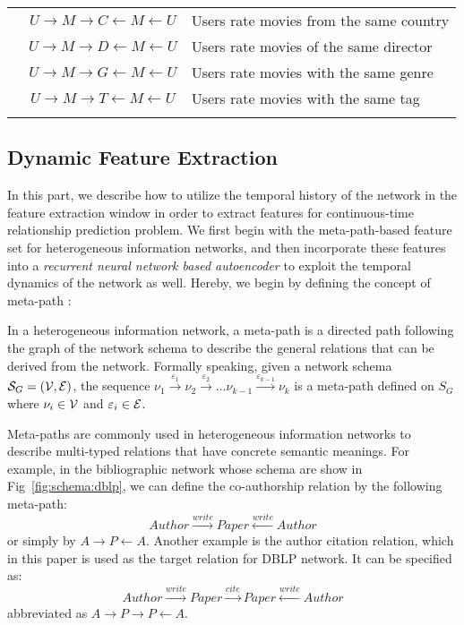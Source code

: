 \begin{table}[t]
\begin{tabular} {c c l}
		& $U\rightarrow M\rightarrow C\leftarrow M\leftarrow U$ & Users rate movies from the same country\\
		& $U\rightarrow M\rightarrow D\leftarrow M\leftarrow U$ & Users rate movies of the same director\\
		& $U\rightarrow M\rightarrow G\leftarrow M\leftarrow U$ & Users rate movies with the same genre\\
		& $U\rightarrow M\rightarrow T\leftarrow M\leftarrow U$ & Users rate movies with the same tag\\
		&&\\
		\bottomrule
	\end{tabular}
\end{table}

\subsection{Dynamic Feature Extraction}
In this part, we describe how to utilize the temporal history of the network in the feature extraction window in order to extract features for continuous-time relationship prediction problem. We first begin with the meta-path-based feature set for heterogeneous information networks, and then incorporate these features into a \emph{recurrent neural network based autoencoder} to exploit the temporal dynamics of the network as well. Hereby, we begin by defining the concept of meta-path \cite{sun2011pathsim}:

\begin{definition}
	In a heterogeneous information network, a meta-path is a directed path following the graph of the network schema to describe the general relations that can be derived from the network. Formally speaking, given a network schema $\mathcal{S}_G=(\mathcal{V}, \mathcal{E})$, the sequence $\nu_1\xrightarrow{\varepsilon_1}\nu_2\xrightarrow{\varepsilon_2}\dots\nu_{k-1}\xrightarrow{\varepsilon_{k-1}}\nu_k$ is a meta-path defined on $S_G$ where $\nu_i\in \mathcal{V}$ and $\varepsilon_i\in \mathcal{E}$.
\end{definition} 

Meta-paths are commonly used in heterogeneous information networks to describe multi-typed relations that have concrete semantic meanings. For example, in the bibliographic network whose schema are show in Fig~\ref{fig:schema:dblp}, we can define the co-authorship relation by the following meta-path:
\[Author\xrightarrow{write}Paper\xleftarrow{write}Author\]
or simply by $A\rightarrow P\leftarrow A$. Another example is the author citation relation, which in this paper is used as the target relation for DBLP network. It can be specified as:
\[Author\xrightarrow{write}Paper\xrightarrow{cite}Paper\xleftarrow{write}Author\]
abbreviated as $A\rightarrow P\rightarrow P\leftarrow A$.

